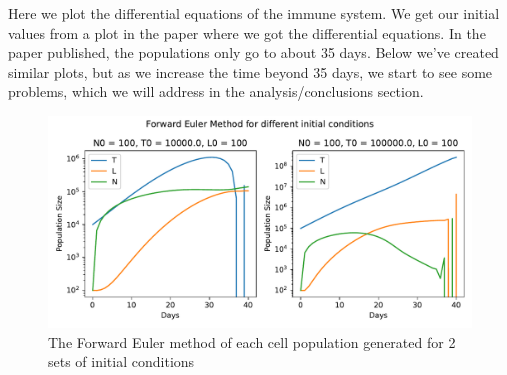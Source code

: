 \documentclass[11pt]{amsart}
\begin{document}
Here we plot the differential equations of the immune system. 
We get our initial values from a plot in the paper where we got the differential equations. 
In the paper published, the populations only go to about 35 days. 
Below we've created similar plots, but as we increase the time beyond 35 days, 
we start to see some problems, which we will address in the analysis/conclusions section.

\begin{figure}[H]
\begin{center} %
\includegraphics[scale=.6]{./images/forward_immune.pdf} %
\end{center}
\caption{The Forward Euler method of each cell population generated for 2 sets of initial conditions}
\label{fig:forward} %
\end{figure}

\end{document}

